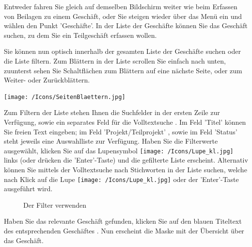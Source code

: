 Entweder fahren Sie gleich auf demselben Bildschirm weiter wie beim Erfassen von Beilagen zu einem Geschäft, oder Sie steigen wieder über das Menü ein und wählen den Punkt 'Geschäfte'. In der Liste der Geschäfte können Sie das Geschäft suchen, zu dem Sie ein Teilgeschäft erfassen wollen.

\vspace{\baselineskip}

Sie können nun optisch innerhalb der gesamten Liste der Geschäfte suchen oder die Liste filtern. Zum Blättern in der Liste scrollen Sie einfach nach unten, zuunterst sehen Sie Schaltflächen zum Blättern auf eine nächste Seite, oder zum Weiter- oder Zurückblättern.

\begin{center}
\texttt{[image: /Icons/SeitenBlaettern.jpg]}
\end{center}

Zum Filtern der Liste stehen Ihnen die Suchfelder in der ersten Zeile zur Verfügung, sowie ein separates Feld für die Volltextsuche . Im Feld 'Titel'  können Sie freien Text eingeben; im Feld 'Projekt/Teilprojekt' , sowie im Feld 'Status'  steht jeweils eine Auswahlliste zur Verfügung. Haben Sie die Filterwerte ausgewählt, klicken Sie auf das Lupensymbol \texttt{[image: /Icons/Lupe\_kl.jpg]}  links (oder drücken die 'Enter'-Taste) und die gefilterte Liste erscheint. Alternativ können Sie mittels der Volltextsuche nach Stichworten in der Liste suchen, welche nach Klick auf die Lupe \texttt{[image: /Icons/Lupe\_kl.jpg]}  oder der 'Enter'-Taste ausgeführt wird.

\begin{figure}[H]
\caption{Der Filter verwenden}
\end{figure}


Haben Sie das relevante Geschäft gefunden, klicken Sie auf den blauen Titeltext des entsprechenden Geschäftes . Nun erscheint die Maske mit der Übersicht über das Geschäft.

